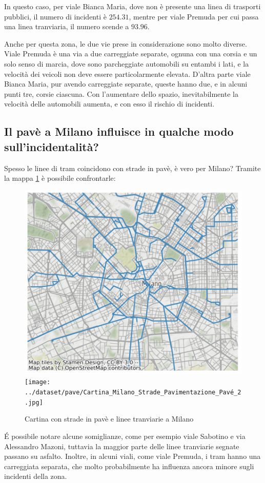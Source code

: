 \documentclass[a4paper]{report}
\begin{document}
In questo caso, per viale Bianca Maria, dove non è presente una linea di trasporti pubblici, 
il numero di incidenti è $254.31$, mentre per viale Premuda per cui passa una linea tranviaria, 
il numero scende a $93.96$.

Anche per questa zona, le due vie prese in considerazione sono molto diverse.
Viale Premuda è una via a due carreggiate separate, ognuna con una corsia e un solo senso di marcia, 
dove sono parcheggiate automobili su entambi i lati, e la velocità dei veicoli non deve essere 
particolarmente elevata.
D'altra parte viale Bianca Maria, pur avendo carreggiate separate, queste hanno due, 
e in alcuni punti tre, corsie ciascuna. 
Con l'aumentare dello spazio, inevitabilmente la velocità delle automobili aumenta, 
e con esso il rischio di incidenti.


\subsection{Il pavè a Milano influisce in qualche modo sull'incidentalità?}

Spesso le linee di tram coincidono con strade in pavè, è vero per Milano? 
Tramite la mappa \ref{fig:tram-pave-milano} è possibile confrontarle: 

\begin{figure}
    \includegraphics[width=0.48\linewidth]{../src/tram/tram_milano.png}
    \texttt{[image: ../dataset/pave/Cartina\_Milano\_Strade\_Pavimentazione\_Pavé\_2.jpg]}
    \caption{Cartina con strade in pavè e linee tranviarie a Milano}
    \label{fig:tram-pave-milano}
\end{figure}

\'E possibile notare alcune somiglianze, come per esempio viale Sabotino e via Alessandro Mazoni, 
tuttavia la maggior parte delle linee tranviarie segnate passano su asfalto.
Inoltre, in alcuni viali, come viale Premuda, i tram hanno una carreggiata separata, 
che molto probabilmente ha influenza ancora minore sugli incidenti della zona.
\end{document}
